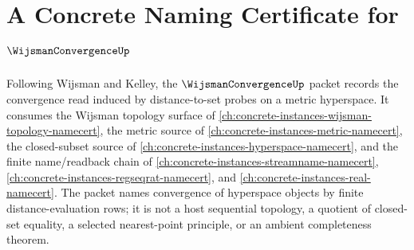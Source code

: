 \chapter{A Concrete Naming Certificate for $\WijsmanConvergenceUp$}
\label{ch:concrete-instances-wijsman-convergence-namecert}

Following Wijsman and Kelley, the $\WijsmanConvergenceUp$ packet records the convergence read induced by distance-to-set probes on a metric hyperspace. It consumes the Wijsman topology surface of \autoref{ch:concrete-instances-wijsman-topology-namecert}, the metric source of \autoref{ch:concrete-instances-metric-namecert}, the closed-subset source of \autoref{ch:concrete-instances-hyperspace-namecert}, and the finite name/readback chain of \autoref{ch:concrete-instances-streamname-namecert}, \autoref{ch:concrete-instances-regseqrat-namecert}, and \autoref{ch:concrete-instances-real-namecert}. The packet names convergence of hyperspace objects by finite distance-evaluation rows; it is not a host sequential topology, a quotient of closed-set equality, a selected nearest-point principle, or an ambient completeness theorem.

